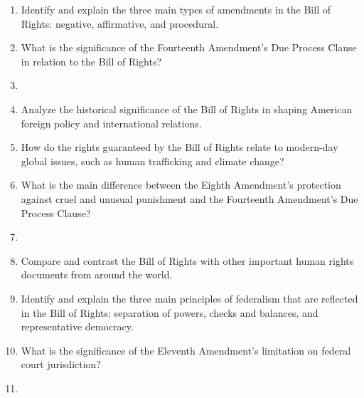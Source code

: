 \documentclass{article}
\begin{document}
\begin{enumerate}
\vspace{2cm} \item Identify and explain the three main types of amendments in the Bill of Rights: negative, affirmative, and procedural. \vspace{2cm} \item What is the significance of the Fourteenth Amendment's Due Process Clause in relation to the Bill of Rights? \vspace{2cm} \item {} \vspace{2cm} \item Analyze the historical significance of the Bill of Rights in shaping American foreign policy and international relations. \vspace{2cm} \item How do the rights guaranteed by the Bill of Rights relate to modern-day global issues, such as human trafficking and climate change? \vspace{2cm} \item What is the main difference between the Eighth Amendment's protection against cruel and unusual punishment and the Fourteenth Amendment's Due Process Clause? \vspace{2cm} \item {} \vspace{2cm} \item Compare and contrast the Bill of Rights with other important human rights documents from around the world. \vspace{2cm} \item Identify and explain the three main principles of federalism that are reflected in the Bill of Rights: separation of powers, checks and balances, and representative democracy. \vspace{2cm} \item What is the significance of the Eleventh Amendment's limitation on federal court jurisdiction? \vspace{2cm} \item {} 
\end{enumerate}
\end{document}
